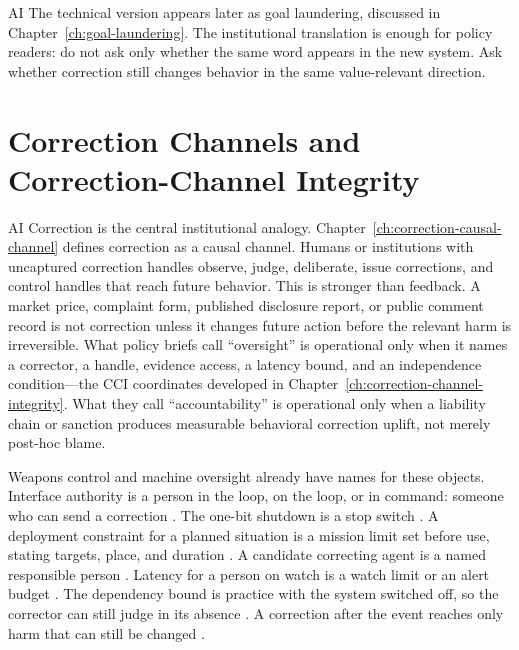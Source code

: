 \begin{refsection}
\begin{authbar}{AI}
The technical version appears later as goal laundering, discussed in Chapter~\ref{ch:goal-laundering}.
The institutional translation is enough for policy readers: do not ask only whether the same word appears in the new system.
Ask whether correction still changes behavior in the same value-relevant direction.

\end{authbar}
\authbarneedspace
\section{Correction Channels and Correction-Channel Integrity}
\label{sec:institutional-correction-and-cci}
\begin{authbar}{AI}
Correction is the central institutional analogy.
Chapter~\ref{ch:correction-causal-channel} defines correction as a causal channel.
Humans or institutions with uncaptured correction handles observe, judge, deliberate, issue corrections, and control handles that reach future behavior.
This is stronger than feedback.
A market price, complaint form, published disclosure report, or public comment record is not correction unless it changes future action before the relevant harm is irreversible.
What policy briefs call ``oversight'' is operational only when it names a corrector, a handle, evidence access, a latency bound, and an independence condition---the CCI coordinates developed in Chapter~\ref{ch:correction-channel-integrity}.
What they call ``accountability'' is operational only when a liability chain or sanction produces measurable behavioral correction uplift, not merely post-hoc blame.

Weapons control and machine oversight already have names for these objects.
Interface authority is a person in the loop, on the loop, or in command: someone who can send a correction \autocite{santonidesio2018meaningful,isoiec42105fdis}.
The one-bit shutdown is a stop switch \autocite{nato2021aistrategy,isoiec82002024}.
A deployment constraint for a planned situation is a mission limit set before use, stating targets, place, and duration \autocite{ccw2025humanelement,bmvg2026k9000}.
A candidate correcting agent is a named responsible person \autocite{roff2016mhc}.
Latency for a person on watch is a watch limit or an alert budget \autocite{boulanin2020limits}.
The dependency bound is practice with the system switched off, so the corrector can still judge in its absence \autocite{bmvg2026k9000}.
A correction after the event reaches only harm that can still be changed \autocite{isoiec42105fdis}.


\end{authbar}
\end{refsection}
